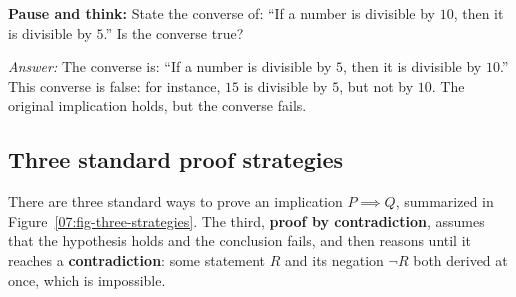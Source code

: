 \begin{recoverybox}
\textbf{Pause and think:} State the converse of: ``If a number is divisible by $10$, then it is divisible by $5$.'' Is the converse true?

\emph{Answer:} The converse is: ``If a number is divisible by $5$, then it is divisible by $10$.'' This converse is false: for instance, $15$ is divisible by $5$, but not by $10$. The original implication holds, but the converse fails.
\end{recoverybox}

\subsection{Three standard proof strategies}

There are three standard ways to prove an implication $P \implies Q$, summarized in Figure~\ref{07:fig-three-strategies}. The third, \textbf{proof by contradiction}, assumes that the hypothesis holds and the conclusion fails, and then reasons until it reaches a \textbf{contradiction}: some statement $R$ and its negation $\neg R$ both derived at once, which is impossible.

